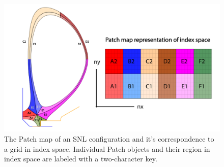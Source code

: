 \begin{figure}[H]
    \centering
    \includegraphics[width=\linewidth]{figures/patch_index_space.pdf}
    \caption{The Patch map of an SNL configuration and it's correspondence to a grid in index space. Individual Patch objects and their region in index space are labeled with a two-character key.}
    \label{fig:snl_patch_index_space}
\end{figure}

